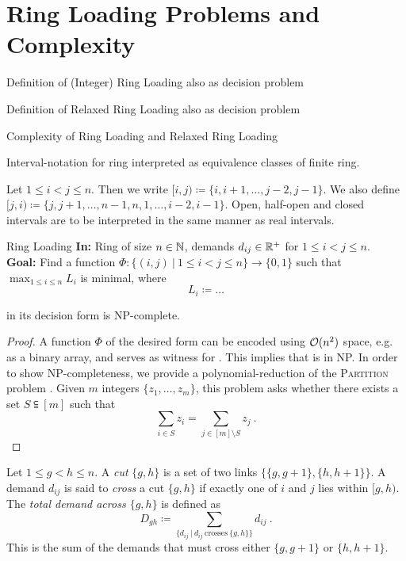 \section{Ring Loading Problems and Complexity}

Definition of (Integer) Ring Loading also as decision problem

Definition of Relaxed Ring Loading also as decision problem

Complexity of Ring Loading and Relaxed Ring Loading

Interval-notation for ring interpreted as equivalence classes of finite ring.

\begin{notation}
	Let $1 \leq i < j \leq n$.
	Then we write $[i, j) \coloneqq \{i, i+1, \ldots, j-2, j-1\}$.
	We also define $[j, i) \coloneqq \{j, j+1, \ldots, n-1, n, 1, \ldots, i-2, i-1\}$.
	Open, half-open and closed intervals are to be interpreted in the same manner as real intervals.
\end{notation}

\begin{problem}{Ring Loading}
	\textbf{In:} Ring of size $n \in \mathbb{N}$, demands $d_{ij} \in \mathbb{R}^+$ for $1 \leq i < j \leq n$.\\
	\textbf{Goal:} Find a function $\Phi: \{(i, j)~|~1 \leq i < j \leq n\} \rightarrow \{0, 1\}$ such that
	$\max_{1 \leq i \leq n} L_i$ is minimal, where
	\begin{equation}
		L_i \coloneqq \ldots
	\end{equation}
\end{problem}

\begin{theorem}
	\RL in its decision form is NP-complete.
\end{theorem}
\begin{proof}
	A function $\Phi$ of the desired form can be encoded using $\mathcal{O}(n^2)$ space, e.g. as a binary array, and serves as witness for \RL.
	This implies that \RL is in NP.
	In order to show NP-completeness, we provide a polynomial-reduction of the \textsc{Partition} problem \cite{karp72}.
	Given $m$ integers $\{z_1, \ldots, z_m\}$, this problem asks whether there exists a set $S \subseteqq [m]$ such that 
	\begin{equation}
		\sum_{i \in S} z_i = \sum_{j \in [m] \setminus S} z_j \ .
	\end{equation}
	
\end{proof}

\begin{definition}
	Let $1 \leq g < h \leq n$.
	A \emph{cut} $\{g, h\}$ is a set of two links $\{\{g, g+1\}, \{h, h+1\}\}$.
	A demand $d_{ij}$ is said to \emph{cross} a cut $\{g, h\}$ if exactly one of $i$ and $j$ lies within $[g, h)$.
	The \emph{total demand across $\{g, h\}$} is defined as
	\begin{equation}
		D_{gh} \coloneqq \sum_{\{d_{ij}~|~d_{ij}\ \text{crosses}\ \{g, h\}\}} d_{ij} \ .
	\end{equation}
	This is the sum of the demands that must cross either $\{g, g+1\}$ or $\{h, h+1\}$.
\end{definition}

